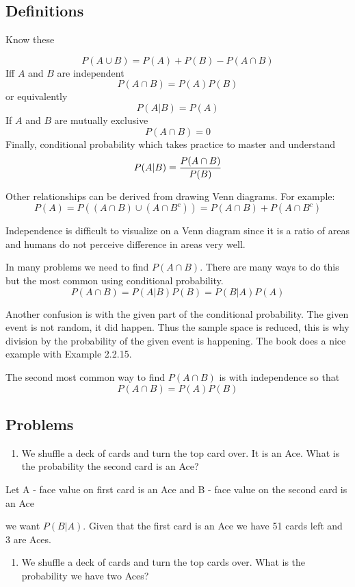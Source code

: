 \documentclass[]{book}
\providecommand{\tightlist}{%
  \setlength{\itemsep}{0pt}\setlength{\parskip}{0pt}}
\theoremstyle{definition}
\theoremstyle{definition}
\theoremstyle{definition}
\theoremstyle{remark}
\begin{document}
\subsection{Definitions}\label{definitions}

Know these

\[P(A \cup B)=P(A)+P(B)-P(A \cap B)\] Iff \(A\) and \(B\) are
independent \[P(A \cap B)=P(A)P(B)\] or equivalently \[P(A|B)=P(A)\] If
\(A\) and \(B\) are mutually exclusive \[P(A \cap B)=0\] Finally,
conditional probability which takes practice to master and understand
\[P(A|B)={P(A \cap B) \over P(B)}\]

Other relationships can be derived from drawing Venn diagrams. For
example:
\[P(A)=P((A \cap B) \cup (A \cap B^c))=P(A\cap B) + P(A \cap B^c)\]

Independence is difficult to visualize on a Venn diagram since it is a
ratio of areas and humans do not perceive difference in areas very well.

In many problems we need to find \(P(A \cap B)\). There are many ways to
do this but the most common using conditional probability.
\[P(A \cap B)=P(A|B)P(B)=P(B|A)P(A)\]

Another confusion is with the given part of the conditional probability.
The given event is not random, it did happen. Thus the sample space is
reduced, this is why division by the probability of the given event is
happening. The book does a nice example with Example 2.2.15.

The second most common way to find \(P(A \cap B)\) is with independence
so that \[P(A \cap B)=P(A)P(B)\]

\subsection{Problems}\label{problems}

\begin{enumerate}
\def\labelenumi{\arabic{enumi}.}
\tightlist
\item
  We shuffle a deck of cards and turn the top card over. It is an Ace.
  What is the probability the second card is an Ace?
\end{enumerate}

Let A - face value on first card is an Ace and B - face value on the
second card is an Ace

we want \(P(B|A)\). Given that the first card is an Ace we have 51 cards
left and 3 are Aces.

\begin{enumerate}
\def\labelenumi{\arabic{enumi}.}
\setcounter{enumi}{1}
\tightlist
\item
  We shuffle a deck of cards and turn the top cards over. What is the
  probability we have two Aces?
\end{enumerate}
\end{document}
